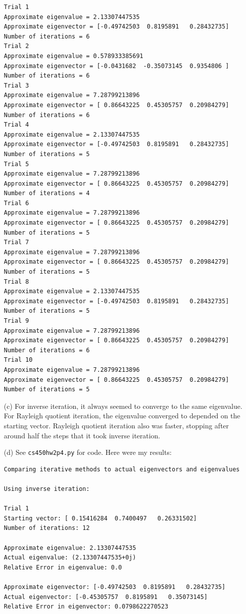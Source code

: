 \documentclass[10pt]{article}
\begin{document}
\begin{itemize}
\begin{verbatim}
Trial 1
Approximate eigenvalue = 2.13307447535
Approximate eigenvector = [-0.49742503  0.8195891   0.28432735]
Number of iterations = 6
Trial 2
Approximate eigenvalue = 0.578933385691
Approximate eigenvector = [-0.0431682  -0.35073145  0.9354806 ]
Number of iterations = 6
Trial 3
Approximate eigenvalue = 7.28799213896
Approximate eigenvector = [ 0.86643225  0.45305757  0.20984279]
Number of iterations = 6
Trial 4
Approximate eigenvalue = 2.13307447535
Approximate eigenvector = [-0.49742503  0.8195891   0.28432735]
Number of iterations = 5
Trial 5
Approximate eigenvalue = 7.28799213896
Approximate eigenvector = [ 0.86643225  0.45305757  0.20984279]
Number of iterations = 4
Trial 6
Approximate eigenvalue = 7.28799213896
Approximate eigenvector = [ 0.86643225  0.45305757  0.20984279]
Number of iterations = 5
Trial 7
Approximate eigenvalue = 7.28799213896
Approximate eigenvector = [ 0.86643225  0.45305757  0.20984279]
Number of iterations = 5
Trial 8
Approximate eigenvalue = 2.13307447535
Approximate eigenvector = [-0.49742503  0.8195891   0.28432735]
Number of iterations = 5
Trial 9
Approximate eigenvalue = 7.28799213896
Approximate eigenvector = [ 0.86643225  0.45305757  0.20984279]
Number of iterations = 6
Trial 10
Approximate eigenvalue = 7.28799213896
Approximate eigenvector = [ 0.86643225  0.45305757  0.20984279]
Number of iterations = 5
\end{verbatim}

\item[(c)] For inverse iteration, it always seemed to converge to the same eigenvalue. For Rayleigh quotient iteration, the eigenvalue converged to depended on the starting vector. Rayleigh quotient iteration also was faster, stopping after around half the steps that it took inverse iteration.

\item[(d)] See \verb+cs450hw2p4.py+ for code. Here were my results:

\begin{verbatim}
Comparing iterative methods to actual eigenvectors and eigenvalues

Using inverse iteration:

Trial 1
Starting vector: [ 0.15416284  0.7400497   0.26331502]
Number of iterations: 12

Approximate eigenvalue: 2.13307447535
Actual eigenvalue: (2.13307447535+0j)
Relative Error in eigenvalue: 0.0

Approximate eigenvector: [-0.49742503  0.8195891   0.28432735]
Actual eigenvector: [-0.45305757  0.8195891   0.35073145]
Relative Error in eigenvector: 0.0798622270523


\end{verbatim}
\end{itemize}
\end{document}
